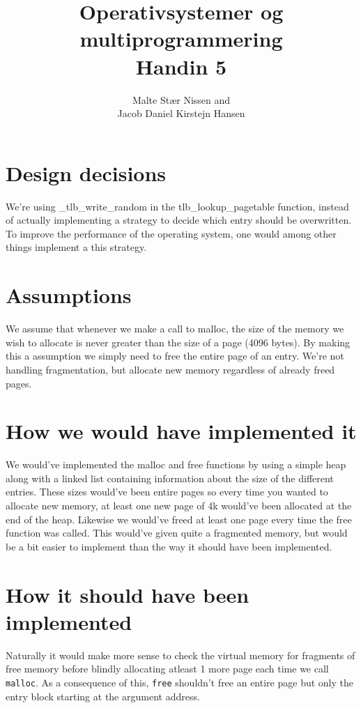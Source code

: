 \documentclass[11pt,a4paper]{article}
\title{Operativsystemer og multiprogrammering \\ Handin 5}
\author{Malte Stær Nissen and \\
        Jacob Daniel Kirstejn Hansen}
\begin{document}
\maketitle

\tableofcontents
\newpage

\section{Design decisions}
We're using \_tlb\_write\_random in the tlb\_lookup\_pagetable function,
instead of actually implementing a strategy to decide which entry should be
overwritten. To improve the performance of the operating system, one would
among other things implement a this strategy.

\section{Assumptions}
We assume that whenever we make a call to malloc, the size of the memory we
wish to allocate is never greater than the size of a page (4096 bytes). By
making this a assumption we simply need to free the entire page of an entry.
We're not handling fragmentation, but allocate new memory regardless of already
freed pages.

\section{How we would have implemented it}
We would've implemented the malloc and free functions by using a simple heap
along with a linked list containing information about the size of the different
entries. These sizes would've been entire pages so every time you wanted to
allocate new memory, at least one new page of 4k would've been allocated at the
end of the heap. Likewise we would've freed at least one page every time the
free function was called. This would've given quite a fragmented memory, but
would be a bit easier to implement than the way it should have been
implemented.

\section{How it should have been implemented}
Naturally it would make more sense to check the virtual memory for fragments of
free memory before blindly allocating atleast 1 more page each time we call
\texttt{malloc}. As a consequence of this, \texttt{free} shouldn't free an
entire page but only the entry block starting at the argument address.
\end{document}
